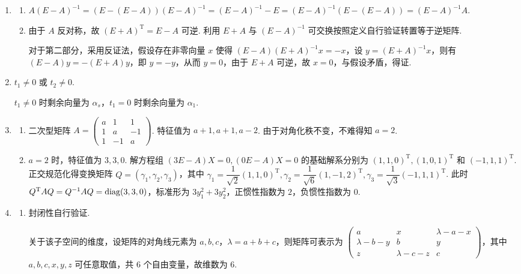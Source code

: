 \begin{enumerate}
    \item \begin{enumerate}
        \item $A(E-A)^{-1} = (E-(E-A))(E-A)^{-1} = (E-A)^{-1} - E = (E-A)^{-1}(E-(E-A)) = (E-A)^{-1}A$.
        \item 由于 $A$ 反对称，故 $(E+A)^\mathrm{T}=E-A$ 可逆. 利用 $E+A$ 与 $(E-A)^{-1}$ 可交换按照定义自行验证转置等于逆矩阵.

        对于第二部分，采用反证法，假设存在非零向量 $x$ 使得 $(E-A)(E+A)^{-1}x = -x$，设 $y=(E+A)^{-1}x$，则有 $(E-A)y = -(E+A)y$，即 $y=-y$，从而 $y=0$，由于 $E+A$ 可逆，故 $x=0$，与假设矛盾，得证.
    \end{enumerate}

    \item $t_1 \neq 0$ 或 $t_2 \neq 0$.

    $t_1 \neq 0$ 时剩余向量为 $\alpha_s$，$t_1=0$ 时剩余向量为 $\alpha_1$.

    \item \begin{enumerate}
        \item 二次型矩阵 $A=\begin{pmatrix}a&1&1\\ 1&a&-1\\ 1&-1&a\end{pmatrix}$. 特征值为 $a+1, a+1, a-2$. 由于对角化秩不变，不难得知 $a=2$.
        \item $a=2$ 时，特征值为 $3,3,0$. 解方程组 $(3E-A)X=0, (0E-A)X=0$ 的基础解系分别为 $(1,1,0)^\mathrm{T}, (1,0,1)^\mathrm{T}$ 和 $(-1,1,1)^\mathrm{T}$. 正交规范化得变换矩阵 $Q=(\gamma_1,\gamma_2,\gamma_3)$，其中 $\gamma_1=\dfrac{1}{\sqrt{2}}(1,1,0)^\mathrm{T}, \gamma_2=\dfrac{1}{\sqrt{6}}(1,-1,2)^\mathrm{T}, \gamma_3=\dfrac{1}{\sqrt{3}}(-1,1,1)^\mathrm{T}$. 此时 $Q^\mathrm{T}AQ=Q^{-1}AQ=\operatorname{diag}(3,3,0)$，标准形为 $3y_1^2+3y_2^2$，正惯性指数为 $2$，负惯性指数为 $0$.
    \end{enumerate}

    \item \begin{enumerate}
        \item 封闭性自行验证.

        关于该子空间的维度，设矩阵的对角线元素为 $a, b, c$，$\lambda = a+b+c$，则矩阵可表示为 $\begin{pmatrix}
            a & x & \lambda - a - x \\
            \lambda - b - y & b & y \\
            z & \lambda - c - z & c
        \end{pmatrix}$，其中 $a, b, c, x, y, z$ 可任意取值，共 $6$ 个自由变量，故维数为 $6$.


\end{enumerate}
\end{enumerate}
